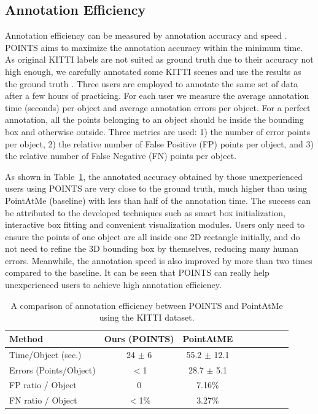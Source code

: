 \documentclass[letterpaper, 10 pt, conference]{ieeeconf}  %
\begin{document}
\subsection{Annotation Efficiency}

Annotation efficiency can be measured by annotation accuracy and speed \cite{pointatme} \cite{Zimmer20193DBA}. POINTS aims to maximize the annotation accuracy within the minimum time.
As original KITTI labels are not suited as ground truth due to their accuracy not high enough, 
we carefully annotated some KITTI scenes and use the results as the ground truth \cite{pointatme}.
Three users are employed to annotate the same set of data after a few hours of practicing. 
For each user we measure the average annotation time (seconds) per object and average annotation errors per object.
For a perfect annotation, all the points belonging to an object should be inside the bounding box and otherwise outside. 
Three metrics are used: 1) the number of error points per object, 
2) the relative number of False Positive (FP) points per object, and 
3) the relative number of False Negative (FN) points per object. 

As shown in Table~\ref{tab:annotation-evaluation}, the annotated accuracy obtained by those unexperienced users using POINTS are very close to the ground truth,
much higher than using PointAtMe (baseline) with less than half of the annotation time. 
The success can be attributed to the developed techniques such as smart box initialization, interactive box fitting and convenient visualization modules. 
Users only need to ensure the points of one object are all inside one 2D rectangle initially, and do not need to refine the 3D bounding box by themselves, 
reducing many human errors. 
Meanwhile, the annotation speed is also improved by more than two times compared to the baseline. 
It can be seen that POINTS can really help unexperienced users to achieve high annotation efficiency. 



\begin{table}[h]
	\centering
	\caption{A comparison of annotation efficiency between POINTS and PointAtMe using the KITTI dataset.}
	\label{tab:annotation-evaluation}
	\begin{tabular}{|l|c|c|c|c||c|c|c|c|}
		\hline
		\textbf{Method} & \textbf{Ours (POINTS)} & \textbf{PointAtME\cite{pointatme}} \\
		\hline
		\hline
		Time/Object (sec.) & 24 $\pm$ 6 & 55.2 $\pm$ 12.1\\
		\hline
		Errors (Points/Object) & $<$1 & 28.7 $\pm$ 5.1\\
		\hline
		FP ratio / Object & 0 & 7.16\%\\
		\hline
		FN ratio / Object & $<$1\% & 3.27\%\\
		\hline
	\end{tabular}
\end{table}
\end{document}

